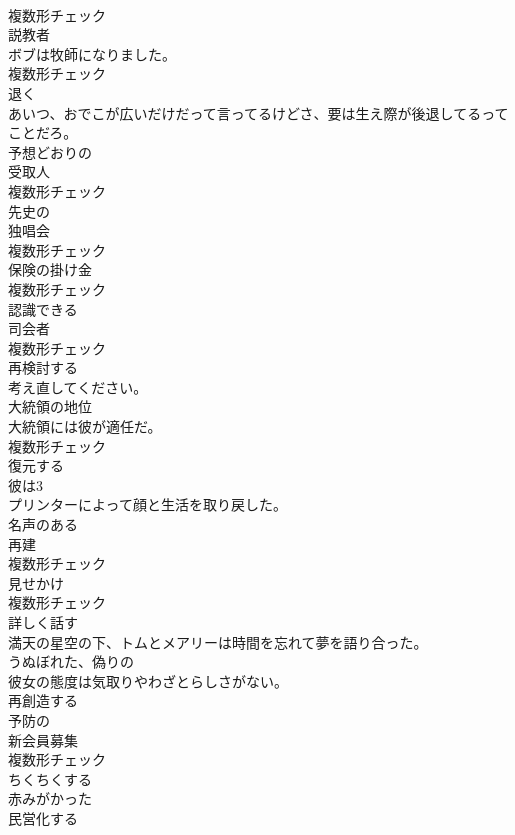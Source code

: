 \documentclass[8pt]{extreport}
\begin{document}
\begin{CJK}{UTF8}{min}
\\	複数形チェック
\\	[名詞]	説教者	
\\	ボブは牧師になりました。	
\\	複数形チェック
\\	[動詞]	退く	
\\	あいつ、おでこが広いだけだって言ってるけどさ、要は生え際が後退してるってことだろ。	
\\	[形容詞]	予想どおりの	
\\	[名詞]	受取人	
\\	複数形チェック
\\	[形容詞]	先史の	
\\	[名詞]	独唱会	
\\	複数形チェック
\\	[名詞]	保険の掛け金	
\\	複数形チェック
\\	[形容詞]	認識できる	
\\	[名詞]	司会者	
\\	複数形チェック
\\	[動詞]	再検討する	
\\	考え直してください。	
\\	[名詞]	大統領の地位	
\\	大統領には彼が適任だ。	
\\	複数形チェック
\\	[動詞]	復元する	
\\	彼は3
\\	プリンターによって顔と生活を取り戻した。	
\\	[形容詞]	名声のある	
\\	[名詞]	再建	
\\	複数形チェック
\\	[名詞]	見せかけ	
\\	複数形チェック
\\	[動詞]	詳しく話す	
\\	満天の星空の下、トムとメアリーは時間を忘れて夢を語り合った。	
\\	[形容詞]	うぬぼれた、偽りの	
\\	彼女の態度は気取りやわざとらしさがない。	
\\	[動詞]	再創造する	
\\	[形容詞]	予防の	
\\	[名詞]	新会員募集	
\\	複数形チェック
\\	[形容詞]	ちくちくする	
\\	[形容詞]	赤みがかった	
\\	[動詞]	⺠営化する	

\end{CJK}
\end{document}
